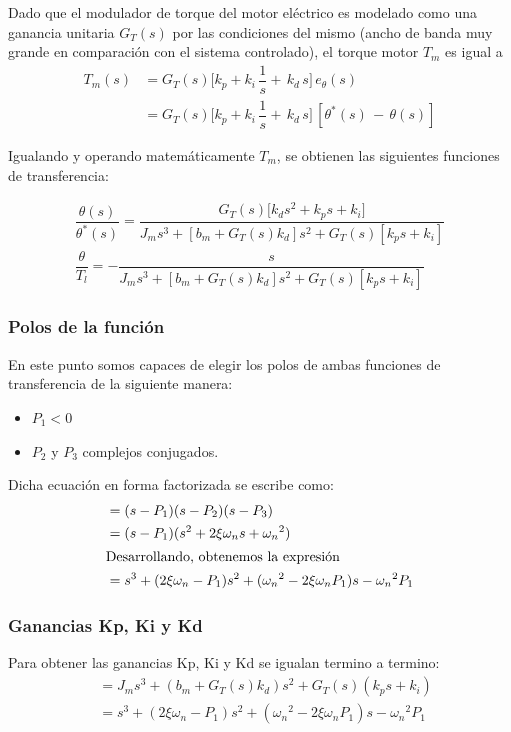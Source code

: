 \documentclass[journal]{IEEEtran}
\begin{document}
Dado que el modulador de torque del motor eléctrico es modelado como una ganancia 
unitaria $G_T(s)$ por las condiciones del mismo (ancho de banda muy grande en 
comparación con el sistema controlado), el torque motor $T_m$ es igual a
 \begin{align}
   T_m (s) &= G_T (s) \big[ k_p + k_i \, \dfrac{1}{s} + \,k_d \,s] \, e_\theta (s) \\
           &= G_T (s) \big[ k_p + k_i \, \dfrac{1}{s} + \,k_d \,s] \, [\theta^* (s) \,-\, \theta (s)]
 \end{align}

Igualando y operando matemáticamente $T_m$, se obtienen las siguientes funciones
de transferencia:

 \begin{align}
    \dfrac{\theta(s)}{\theta^*(s)} = \dfrac{G_T(s)\big[k_d s^2 + k_p s + k_i]}{J_m s^3 + [b_m + G_T(s) k_d] s^2 + G_T (s)[k_p s + k_i]}\\
    \dfrac{\theta}{T_l} = - \dfrac{s}{J_m s^3 + [b_m + G_T(s) k_d] s^2 + G_T(s)[k_p s + k_i]}
 \end{align}
 
 
\subsubsection{Polos de la función}
En este punto somos capaces de elegir los polos de ambas funciones de transferencia de la 
siguiente manera:
\begin{itemize}
 \item $P_1 < 0$ 
 \item $P_2$ y $P_3$ complejos conjugados.
\end{itemize}
Dicha ecuación en forma factorizada se escribe como:
\begin{align}
    &=(s - P_1)(s - P_2)(s - P_3)\\
    &=(s - P_1)(s^2 + 2 \xi {\omega}_n s + {{\omega}_n}^2)\\
    \intertext{Desarrollando, obtenemos la expresión} 
    &=s^3 + (2 \xi {\omega}_n - P_1) s^2 + ({{\omega}_n}^2 - 2 \xi {\omega}_n P_1) s - {{\omega}_n}^2 P_1
\end{align}



\subsubsection{Ganancias Kp, Ki y Kd}
Para obtener las ganancias Kp, Ki y Kd se igualan termino a termino:
\begin{align}
  &=J_m s^3 + (b_m + G_T(s) k_d) s^2 + G_T (s)(k_p s + k_i)\\
  &= s^3 + (2 \xi {\omega}_n - P_1) s^2 + ({{\omega}_n}^2 - 2 \xi {\omega}_n P_1) s - {{\omega}_n}^2 P_1
\end{align}
\end{document}
